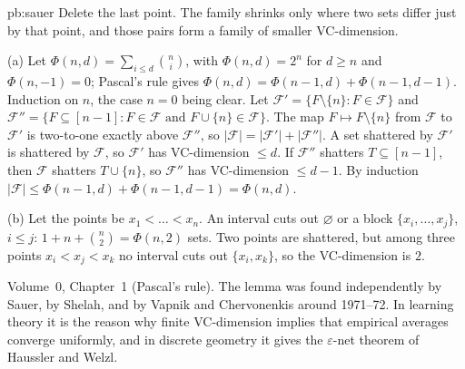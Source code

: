 \begin{solution}{pb:sauer}
\idea Delete the last point. The family shrinks only where two sets differ just by that point, and those pairs form a family of
smaller VC-dimension.

\writeup (a) Let $\Phi(n,d)=\sum_{i\le d}\binom ni$, with $\Phi(n,d)=2^n$ for $d\ge n$ and $\Phi(n,-1)=0$; Pascal's rule gives $\Phi(n,d)=\Phi(n-1,d)+\Phi(n-1,d-1)$.
Induction on $n$, the case $n=0$ being clear. Let $\mathcal F'=\{F\setminus\{n\}:F\in\mathcal F\}$ and $\mathcal F''=\{F\subseteq[n-1]:F\in\mathcal F\text{ and }F\cup\{n\}\in\mathcal F\}$. The
map $F\mapsto F\setminus\{n\}$ from $\mathcal F$ to $\mathcal F'$ is two-to-one exactly above $\mathcal F''$, so $|\mathcal F|=|\mathcal F'|+|\mathcal F''|$. A set shattered by $\mathcal F'$ is shattered by $\mathcal F$,
so $\mathcal F'$ has VC-dimension $\le d$. If $\mathcal F''$ shatters $T\subseteq[n-1]$, then $\mathcal F$ shatters $T\cup\{n\}$, so $\mathcal F''$ has VC-dimension $\le d-1$. By
induction $|\mathcal F|\le\Phi(n-1,d)+\Phi(n-1,d-1)=\Phi(n,d)$.

(b) Let the points be $x_1<\dots<x_n$. An interval cuts out $\varnothing$ or a block $\{x_i,\dots,x_j\}$, $i\le j$: $1+n+\binom n2=\Phi(n,2)$ sets. Two points are
shattered, but among three points $x_i<x_j<x_k$ no interval cuts out $\{x_i,x_k\}$, so the VC-dimension is $2$.

\tools Volume~0, Chapter~1 (Pascal's rule).
\leads The lemma was found independently by Sauer, by Shelah, and by Vapnik and Chervonenkis around 1971--72. In learning
theory it is the reason why finite VC-dimension implies that empirical averages converge uniformly, and in discrete geometry
it gives the $\varepsilon$-net theorem of Haussler and Welzl.
\end{solution}

